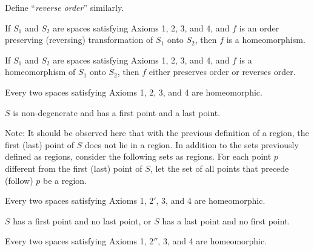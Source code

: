 \documentclass{article}
\begin{document}
\begin{description}
     Define ``\emph{reverse order}'' similarly.
  \item[Theorem 74:] If $S_{1}$ and $S_{2}$ are spaces satisfying Axioms 1, 2, 3, and 4, and $f$ is an order preserving (reversing) transformation of $S_{1}$ onto $S_{2}$, then $f$ is a homeomorphism.
  \item[Theorem 75:] If $S_{1}$ and $S_{2}$ are spaces satisfying Axioms 1, 2, 3, and 4, and $f$ is a homeomorphism of $S_{1}$ onto $S_{2}$, then $f$ either preserves order or reverses order.
  \item[Theorem 76:] Every two spaces satisfying Axioms 1, 2, 3, and 4 are homeomorphic.
  \item[Axiom 2$'$:] $S$ is non-degenerate and has a first point and a last point.

     Note: It should be observed here that with the previous definition of a region, the first (last) point of $S$ does not lie in a region. In addition to the sets previously defined as regions, consider the following sets as regions. For each point $p$ different from the first (last) point of $S$, let the set of all points that precede (follow) $p$ be a region.
  \item[Theorem 77:] Every two spaces satisfying Axioms 1, 2$'$, 3, and 4 are homeomorphic.
  \item[Axiom 2$''$:] $S$ has a first point and no last point, or $S$ has a last point and no first point.
  \item[Theorem 78:] Every two spaces satisfying Axioms 1, 2$''$, 3, and 4 are homeomorphic.
\end{description}
\end{document}
